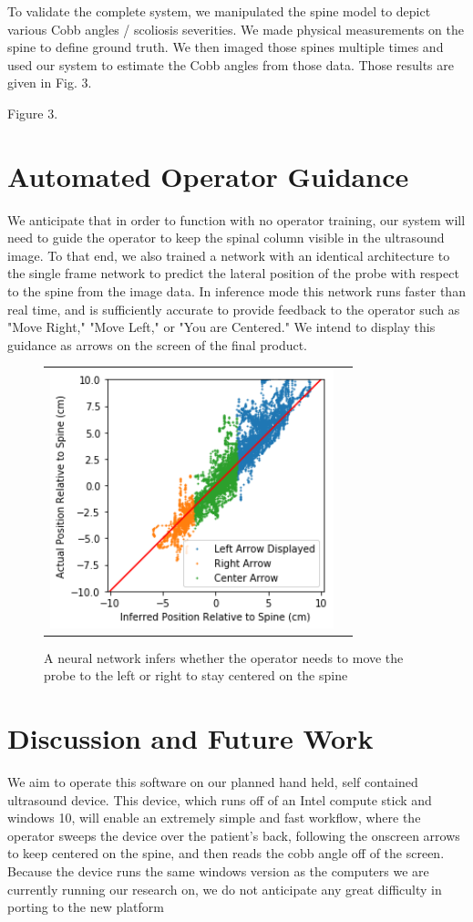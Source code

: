 \documentclass{article}
\begin{document}
To validate the complete system, we manipulated the spine model to depict various Cobb angles / scoliosis severities.   We made physical measurements on the spine to define ground truth.  We then imaged those spines multiple times and used our system to estimate the Cobb angles from those data.  Those results are given in Fig. 3.


Figure 3. 

\section{Automated Operator Guidance}
We anticipate that in order to function with no operator training, our system will need to guide the operator to keep the spinal column visible in the ultrasound image. To that end, we also trained a network with an identical architecture to the single frame network to predict the lateral position of the probe with respect to the spine from the image data. In inference mode this network runs faster than real time, and is sufficiently accurate to provide feedback to the operator such as "Move Right," "Move Left," or "You are Centered." We intend to display this guidance as arrows on the screen of the final product.

\begin{figure}
\centering
\begin{tabular}{cc}
\centering
\includegraphics[height=7.5cm,keepaspectratio]{Guidance}
\end{tabular}
\caption{A neural network infers whether the operator needs to move the probe to the left or right to stay centered on the spine
}
\end{figure}

\section{Discussion and Future Work}
We aim to operate this software on our planned hand held, self contained ultrasound device. This device, which runs off of an Intel compute stick and windows 10, will enable an extremely simple and fast workflow, where the operator sweeps the device over the patient’s back, following the onscreen arrows to keep centered on the spine, and then reads the cobb angle off of the screen. Because the device runs the same windows version as the computers we are currently running our research on, we do not anticipate any great difficulty in porting to the new platform
\end{document}
